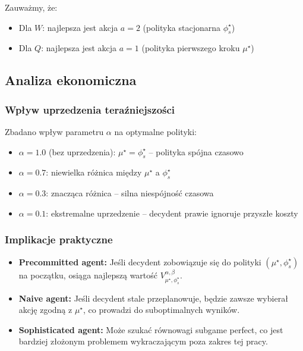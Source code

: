 Zauważmy, że:
\begin{itemize}
\item Dla $W$: najlepsza jest akcja $a = 2$ (polityka stacjonarna $\phi_s^\star$)
\item Dla $Q$: najlepsza jest akcja $a = 1$ (polityka pierwszego kroku $\mu^\star$)
\end{itemize}

\subsection{Analiza ekonomiczna}

\subsubsection{Wpływ uprzedzenia teraźniejszości}

Zbadano wpływ parametru $\alpha$ na optymalne polityki:

\begin{itemize}
\item $\alpha = 1.0$ (bez uprzedzenia): $\mu^\star = \phi_s^\star$ -- polityka spójna czasowo
\item $\alpha = 0.7$: niewielka różnica między $\mu^\star$ a $\phi_s^\star$
\item $\alpha = 0.3$: znacząca różnica -- silna niespójność czasowa
\item $\alpha = 0.1$: ekstremalne uprzedzenie -- decydent prawie ignoruje przyszłe koszty
\end{itemize}

\subsubsection{Implikacje praktyczne}

\begin{itemize}
\item \textbf{Precommitted agent:} Jeśli decydent zobowiązuje się do polityki $(\mu^\star, \phi_s^\star)$ na początku, osiąga najlepszą wartość $V^{\alpha,\beta}_{\mu^\star,\phi_s^\star}$.
\item \textbf{Naive agent:} Jeśli decydent stale przeplanowuje, będzie zawsze wybierał akcję zgodną z $\mu^\star$, co prowadzi do suboptimalnych wyników.
\item \textbf{Sophisticated agent:} Może szukać równowagi subgame perfect, co jest bardziej złożonym problemem wykraczającym poza zakres tej pracy.
\end{itemize}

